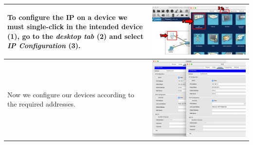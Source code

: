 \documentclass[11pt,a4paper]{report}
\begin{document}
\begin{flushleft}
\begin{center}
\begin{longtable}{ m{5cm} l }
                        To configure the IP on a device we must \textbf{single-click} in the intended device (1), go to the \textit{desktop tab} (2) and select \textit{IP Configuration} (3).                                                                                                      & \includegraphics[scale=0.35,valign=c]{phase2/images/p1-connectingdevices/CiscoPacketTracer_configIP} \\ \hline
                        Now we configure our devices according to the required addresses.                                                                                                                                                                                                           & \includegraphics[scale=0.34,valign=c]{phase2/images/p1-connectingdevices/Laptop0PC0_ip} \\ \hline

\end{longtable}
\end{center}
\end{flushleft}
\end{document}
